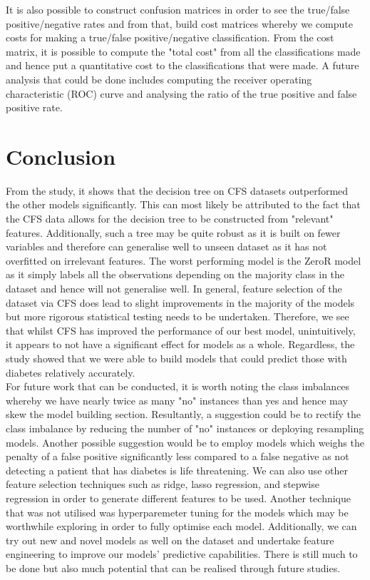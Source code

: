 \documentclass[12pt]{article}
\begin{document}
It is also possible to construct confusion matrices in order to see the true/false positive/negative rates and from that, build cost matrices whereby we compute costs for making a true/false positive/negative classification. From the cost matrix, it is possible to compute the "total cost" from all the classifications made and hence put a quantitative cost to the classifications that were made. A future analysis that could be done includes computing the receiver operating characteristic (ROC) curve and analysing the ratio of the true positive and false positive rate.

\newpage
{}
{}
\section*{Conclusion}

From the study, it shows that the decision tree on CFS datasets outperformed the other models significantly. This can most likely be attributed to the fact that the CFS data allows for the decision tree to be constructed from "relevant" features. Additionally, such a tree may be quite robust as it is built on fewer variables and therefore can generalise well to unseen dataset as it has not overfitted on irrelevant features. The worst performing model is the ZeroR model as it simply labels all the observations depending on the majority class in the dataset and hence will not generalise well. In general, feature selection of the dataset via CFS does lead to slight improvements in the majority of the models but more rigorous statistical testing needs to be undertaken. Therefore, we see that whilst CFS has improved the performance of our best model, unintuitively, it appears to not have a significant effect for models as a whole. Regardless, the study showed that we were able to build models that could predict those with diabetes relatively accurately.\\


For future work that can be conducted, it is worth noting the class imbalances whereby we have nearly twice as many "no" instances than yes and hence may skew the model building section. Resultantly, a suggestion could be to rectify the class imbalance by reducing the number of "no" instances or deploying resampling models. Another possible suggestion would be to employ models which weighs the penalty of a false positive significantly less compared to a false negative as not detecting a patient that has diabetes is life threatening. We can also use other feature selection techniques such as ridge, lasso regression, and stepwise regression in order to generate different features to be used. Another technique that was not utilised was hyperparemeter tuning for the models which may be worthwhile exploring in order to fully optimise each model. Additionally, we can try out new and novel models as well on the dataset and undertake feature engineering to improve our models' predictive capabilities. There is still much to be done but also much potential that can be realised through future studies.
\end{document}
